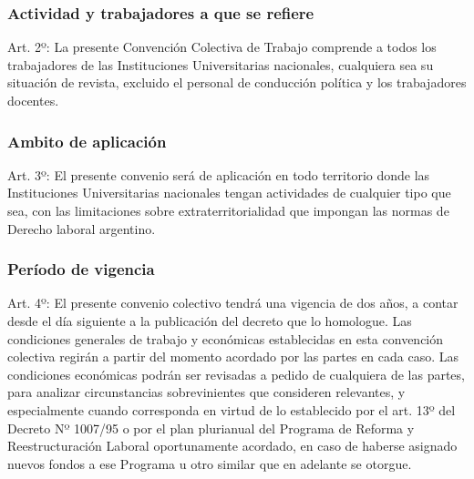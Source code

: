 \documentclass[]{article}
\begin{document}
\subsubsection{Actividad y trabajadores a que se
refiere}\label{actividad-y-trabajadores-a-que-se-refiere}

Art. 2º: La presente Convención Colectiva de Trabajo comprende a todos
los trabajadores de las Instituciones Universitarias nacionales,
cualquiera sea su situación de revista, excluido el personal de
conducción política y los trabajadores docentes.

\subsubsection{Ambito de aplicación}\label{ambito-de-aplicaciuxf3n}

Art. 3º: El presente convenio será de aplicación en todo territorio
donde las Instituciones Universitarias nacionales tengan actividades de
cualquier tipo que sea, con las limitaciones sobre extraterritorialidad
que impongan las normas de Derecho laboral argentino.

\subsubsection{Período de vigencia}\label{peruxedodo-de-vigencia}

Art. 4º: El presente convenio colectivo tendrá una vigencia de dos años,
a contar desde el día siguiente a la publicación del decreto que lo
homologue. Las condiciones generales de trabajo y económicas
establecidas en esta convención colectiva regirán a partir del momento
acordado por las partes en cada caso. Las condiciones económicas podrán
ser revisadas a pedido de cualquiera de las partes, para analizar
circunstancias sobrevinientes que consideren relevantes, y especialmente
cuando corresponda en virtud de lo establecido por el art. 13º del
Decreto Nº 1007/95 o por el plan plurianual del Programa de Reforma y
Reestructuración Laboral oportunamente acordado, en caso de haberse
asignado nuevos fondos a ese Programa u otro similar que en adelante se
otorgue.
\end{document}
